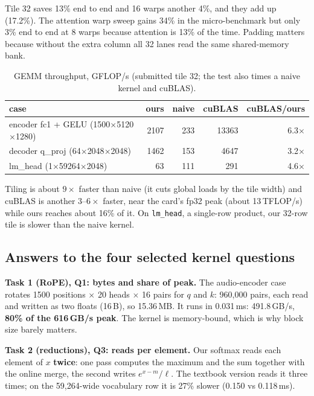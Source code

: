 \documentclass{article}
\begin{document}
Tile 32 saves 13\% end to end and 16 warps another 4\%, and they add up (17.2\%). The attention warp sweep gains 34\% in the micro-benchmark but only 3\% end to end at 8 warps because attention is 13\% of the time. Padding matters because without the extra column all 32 lanes read the same shared-memory bank.

\begin{table}[h]
\centering\small
\caption{GEMM throughput, GFLOP/s (submitted tile 32; the test also times a naive kernel and cuBLAS).}
\label{tab:gemm}
\begin{tabular}{lrrrr}
\toprule
case & ours & naive & cuBLAS & cuBLAS/ours\\
\midrule
encoder fc1 + GELU (1500$\times$5120$\times$1280) & 2107 & 233 & 13363 & 6.3$\times$\\
decoder q\_proj (64$\times$2048$\times$2048) & 1462 & 153 & 4647 & 3.2$\times$\\
lm\_head (1$\times$59264$\times$2048) & 63 & 111 & 291 & 4.6$\times$\\
\bottomrule
\end{tabular}
\end{table}

Tiling is about $9\times$ faster than naive (it cuts global loads by the tile width) and cuBLAS is another $3$--$6\times$ faster, near the card's fp32 peak (about 13\,TFLOP/s) while ours reaches about 16\% of it. On \texttt{lm\_head}, a single-row product, our 32-row tile is slower than the naive kernel.

\subsection{Answers to the four selected kernel questions}
\label{sec:answers}
\textbf{Task 1 (RoPE), Q1: bytes and share of peak.} The audio-encoder case rotates 1500 positions $\times$ 20 heads $\times$ 16 pairs for $q$ and $k$: 960{,}000 pairs, each read and written as two floats (16\,B), so 15.36\,MB. It runs in 0.031\,ms: 491.8\,GB/s, \textbf{80\% of the 616\,GB/s peak}. The kernel is memory-bound, which is why block size barely matters.

\textbf{Task 2 (reductions), Q3: reads per element.} Our softmax reads each element of $x$ \textbf{twice}: one pass computes the maximum and the sum together with the online merge, the second writes $e^{x-m}/\ell$. The textbook version reads it three times; on the 59{,}264-wide vocabulary row it is 27\% slower (0.150 vs 0.118\,ms).
\end{document}
